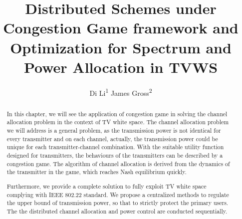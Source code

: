 \documentclass[times]{ettauth}
\theoremstyle{mytheoremstyle}
\theoremstyle{mytheoremstyle}
\theoremstyle{mytheoremstyle}
\begin{document}


\title{Distributed Schemes under Congestion Game framework and Optimization for Spectrum and Power Allocation in TVWS}
\author{Di Li\textsuperscript{1} James Gross\textsuperscript{2}}
\address{RWTH Aachen University\textsuperscript{1}, KTH Royal Institute of Technology\textsuperscript{2} }




\begin{abstract}
\small In this chapter, we will see the application of congestion game in solving the channel allocation problem in the context of TV white space.
The channel allocation problem we will address is a general problem, as the transmission power is not identical for every transmitter and on each channel, actually, the transmission power could be unique for each transmitter-channel combination.
With the suitable utility function designed for transmitters, the behaviours of the transmitters can be described by a congestion game.
The algorithm of channel allocation is derived from the dynamics of the transmitter in the game, which reaches Nash equilibrium quickly.

Furthermore, we provide a complete solution to fully exploit TV white space complying with IEEE 802.22 standard.
We propose a centralized methods to regulate the upper bound of transmission power, so that to strictly protect the primary users.
The the distributed channel allocation and power control are conducted sequentially.
\end{abstract}
\end{document}
